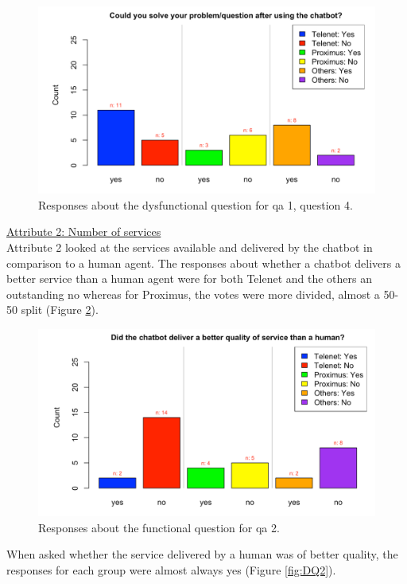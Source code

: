 \begin{figure}[!htb]
	\includegraphics[width=\linewidth, scale=0.5]{../LaTeX/Figures/Comparative/DQ1c.png}
	\caption{Responses about the dysfunctional question for \acrshort{qa} 1, question 4.}\label{fig:DQ1c}
\end{figure}
\break
\ul{Attribute 2: Number of services}\\
\break
Attribute 2 looked at the services available and delivered by the chatbot in comparison to a human agent. The responses about whether a chatbot delivers a better service than a human agent were for both Telenet and the others an outstanding no whereas for Proximus, the votes were more divided, almost a 50-50 split (Figure \ref{fig:Q2}).\\
\begin{figure}[!htb]
	\includegraphics[width=\linewidth, scale=0.5]{../LaTeX/Figures/Comparative/Q2.png}
	\caption{Responses about the functional question for \acrshort{qa} 2.}\label{fig:Q2}
\end{figure}
When asked whether the service delivered by a human was of better quality, the responses for each group were almost always yes (Figure \ref{fig:DQ2}).\\
